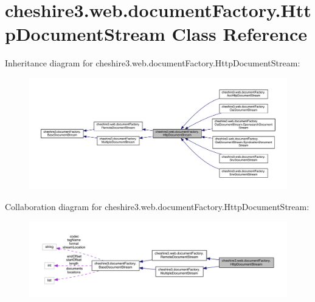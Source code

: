 \hypertarget{classcheshire3_1_1web_1_1document_factory_1_1_http_document_stream}{\section{cheshire3.\-web.\-document\-Factory.\-Http\-Document\-Stream Class Reference}
\label{classcheshire3_1_1web_1_1document_factory_1_1_http_document_stream}
}


Inheritance diagram for cheshire3.\-web.\-document\-Factory.\-Http\-Document\-Stream\-:
\nopagebreak
\begin{figure}[H]
\begin{center}
\leavevmode
\includegraphics[width=350pt]{classcheshire3_1_1web_1_1document_factory_1_1_http_document_stream__inherit__graph}
\end{center}
\end{figure}


Collaboration diagram for cheshire3.\-web.\-document\-Factory.\-Http\-Document\-Stream\-:
\nopagebreak
\begin{figure}[H]
\begin{center}
\leavevmode
\includegraphics[width=350pt]{classcheshire3_1_1web_1_1document_factory_1_1_http_document_stream__coll__graph}
\end{center}
\end{figure}
